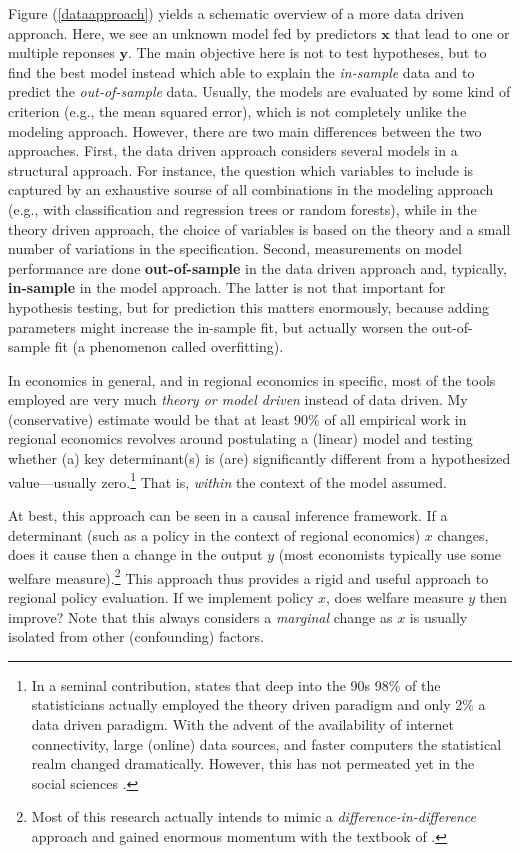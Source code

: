 \documentclass[fleqn,10pt]{SelfArx} %
\begin{document}
Figure (\ref{dataapproach}) yields a schematic overview of a more data driven
approach. Here, we see an unknown model fed by predictors $\mathbf{x}$ that lead
to one or multiple reponses $\mathbf{y}$. The main objective here is not to test
hypotheses, but to find the best model instead which able to explain the
\emph{in-sample} data and to predict the \emph{out-of-sample} data.
Usually, the models are evaluated by some kind of criterion (e.g., the mean squared
error), which is not completely unlike the modeling approach. However, there are
two main differences between the two approaches. First, the data driven approach
considers several models in a structural approach. For instance, the question
which variables to include is captured by an exhaustive sourse of all
combinations in the modeling approach (e.g., with classification and regression
trees or random forests), while in the theory driven approach, the choice of
variables is based on the theory and a small number of variations in the
specification. Second, measurements on model performance are done
\textbf{out-of-sample} in the data driven approach and, typically,
\textbf{in-sample} in the model approach. The latter is not that important for
hypothesis testing, but for prediction this matters enormously, because adding
parameters might increase the in-sample fit, but actually worsen the
out-of-sample fit (a phenomenon called overfitting).  

In economics in general, and in regional economics
in specific, most of the tools employed are very much \textit{theory or model
  driven} instead of data driven. My (conservative) estimate would be that at least 90\%
of all empirical work in regional economics revolves around postulating a
(linear) model and testing whether (a) key determinant(s) is (are) significantly
different from a hypothesized value---usually zero.\footnote{In a seminal
  contribution, \cite{breiman2001statistical} states that deep into the 90s 98\%
  of the statisticians actually employed the theory driven paradigm and only 2\%
  a data driven paradigm. With the advent of the availability of internet
  connectivity, large (online) data sources, and faster computers the
  statistical realm changed dramatically. However, this has not permeated yet in
  the social sciences \citep[see as well][]{varian2014big}.} That is, \textit{within} the context of the model assumed.

At best, this approach can be seen in a causal inference framework. If a
determinant (such as a policy in the context of regional economics) $x$ changes, does it
cause then a change in the output $y$ (most economists typically use some
welfare measure).\footnote{Most of this research actually intends to mimic a
  \textit{difference-in-difference} approach and gained enormous momentum with
  the textbook of \citet{angrist2008mostly}.} This approach thus provides a
rigid and useful approach to regional policy evaluation. If we implement policy
$x$, does welfare measure $y$ then improve? Note that this always considers a
\textit{marginal} change as $x$ is usually isolated from other (confounding) factors.
\end{document}
